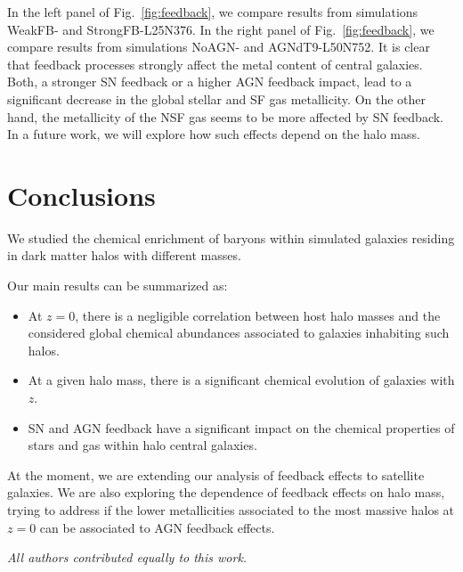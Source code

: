 \documentclass[baaa]{baaa}
\begin{document}
In the left panel of Fig.~\ref{fig:feedback}, we compare results from simulations WeakFB- and StrongFB-L25N376. In the right panel of Fig.~\ref{fig:feedback}, we compare results from simulations NoAGN- and AGNdT9-L50N752. It is clear that feedback processes strongly affect the metal content of central galaxies. Both, a stronger SN feedback or a higher AGN feedback impact, lead to a significant decrease in the global stellar and SF gas metallicity. On the other hand, the metallicity of the NSF gas seems to be more affected by SN feedback. In a future work, we will explore how such effects depend on the halo mass.


\section{Conclusions}

We studied the chemical enrichment of baryons within simulated galaxies residing in dark matter halos with different masses.

Our main results can be summarized as:

\begin{itemize}
	\item At $z=0$, there is a negligible correlation between host halo masses and the considered global chemical abundances associated to galaxies inhabiting such halos.
\item At a given halo mass, there is a significant chemical evolution of galaxies with $z$.
\item SN and AGN feedback have a significant impact on the chemical properties of stars and gas within halo central galaxies.
\end{itemize}

At the moment, we are extending our analysis of feedback effects to satellite galaxies.
We are also exploring the dependence of feedback effects on halo mass, trying to address if the lower metallicities associated to the most massive halos at $z=0$ can be associated to AGN feedback effects.


{\em All authors contributed equally to this work.}
\end{document}
